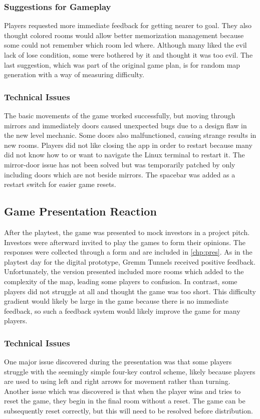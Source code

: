 \documentclass{scrreprt}
\begin{document}
				\subsubsection{Suggestions for Gameplay}
					Players requested more immediate feedback for getting nearer to goal. They also thought colored rooms would allow better memorization management because some could not remember which room led where. Although many liked the evil lack of lose condition, some were bothered by it and thought it was too evil. The last suggestion, which was part of the original game plan, is for random map generation with a way of measuring difficulty.
				
				\subsubsection{Technical Issues}
					The basic movements of the game worked successfully, but moving through mirrors and immediately doors caused unexpected bugs due to a design flaw in the new level mechanic. Some doors also malfunctioned, causing strange results in new rooms. Players did not like closing the app in order to restart because many did not know how to or want to navigate the Linux terminal to restart it. The mirror-door issue has not been solved but was temporarily patched by only including doors which are not beside mirrors. The spacebar was added as a restart switch for easier game resets.
			
			\subsection{Game Presentation Reaction}
				After the playtest, the game was presented to mock investors in a project pitch. Investors were afterward invited to play the games to form their opinions. The responses were collected through a form and are included in \autoref{chp:pres}. As in the playtest day for the digital prototype, Gremm Tunnels received positive feedback. Unfortunately, the version presented included more rooms which added to the complexity of the map, leading some players to confusion. In contrast, some players did not struggle at all and thought the game was too short. This difficulty gradient would likely be large in the game because there is no immediate feedback, so such a feedback system would likely improve the game for many players.
				
				\subsubsection{Technical Issues}
					One major issue discovered during the presentation was that some players struggle with the seemingly simple four-key control scheme, likely because players are used to using left and right arrows for movement rather than turning. Another issue which was discovered is that when the player wins and tries to reset the game, they begin in the final room without a reset. The game can be subsequently reset correctly, but this will need to be resolved before distribution.
		
\end{document}
